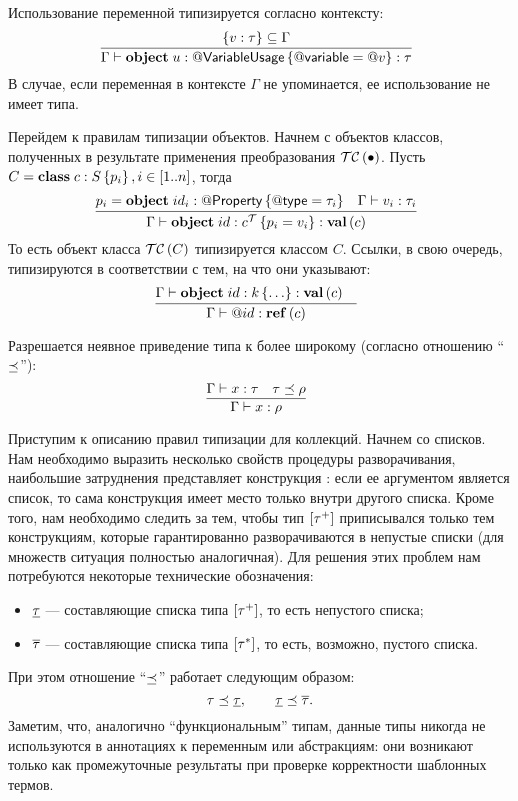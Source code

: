 Использование переменной типизируется согласно контексту:
$$
\trule{
	\{v : \tau\} \subseteq \Gamma
}{
	\Gamma \vdash 
		\Object{u}{\RefSt{VariableUsage}}{\RefSt{variable} = \Ref{v}} : \tau
}{}
$$ 
В случае, если переменная в контексте $\Gamma$ не упоминается, ее использование не имеет типа.

Перейдем к правилам типизации объектов. Начнем с объектов классов, полученных в результате применения преобразования $\mathcal{TC}\left(\bullet\right)$. Пусть $C = \mathbf{class}\;c : S \left\{p_i\right\}, i \in [1..n]$, тогда
$$
\trule{
	p_i = \Object{id_i}{\RefSt{Property}}{\RefSt{type} = \tau_i} &
	\Gamma \vdash v_i : \tau_i
}{
	\Gamma \vdash \Object{id}{c^\mathcal{T}}{p_i = v_i} : \ClassT{c}
}{}
$$ 
То есть объект класса $\mathcal{TC}\left(C\right)$ типизируется классом $C$.
Ссылки, в свою очередь, типизируются в соответствии с тем, на что они указывают:
$$
\trule{
	\Gamma \vdash \Object{id}{k}{\ldots} : \ClassT{c} &
}{
	\Gamma \vdash \Ref{id} : \RefT{c}
}{}
$$ 

Разрешается неявное приведение типа к более широкому (согласно отношению ``$\preceq$''):
$$
\trule{
	\Gamma \vdash x : \tau &	
	\tau \subtype \rho	
}{
	 \Gamma \vdash x : \rho
}{}
$$ 

Приступим к описанию правил типизации для коллекций. Начнем со списков. Нам необходимо выразить несколько свойств процедуры разворачивания, наибольшие затруднения представляет конструкция : если ее аргументом является список, то сама конструкция имеет место только внутри другого списка. Кроме того, нам необходимо следить за тем, чтобы тип $\left[\tau^+\right]$ приписывался только тем конструкциям, которые гарантированно разворачиваются в непустые списки (для множеств ситуация полностью аналогичная). Для решения этих проблем нам потребуются некоторые технические обозначения:
\begin{itemize}
\item $\underline{\tau}$ --- составляющие списка типа $\left[\tau^+\right]$, то есть непустого списка;
\item $\overline{\tau}$ --- составляющие списка типа $\left[\tau^*\right]$, то есть, возможно, пустого списка.
\end{itemize}

При этом отношение ``$\preceq$'' работает следующим образом:
$$
\tau \preceq \underline{\tau},
\qquad
\underline{\tau} \preceq \overline{\tau}.
$$
\noindent
Заметим, что, аналогично ``функциональным'' типам, данные типы никогда не используются в аннотациях к переменным или абстракциям: они возникают только как промежуточные результаты при проверке корректности шаблонных термов.

